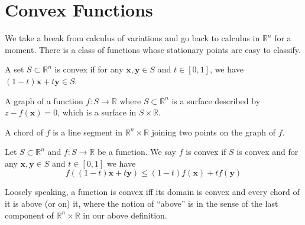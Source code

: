 \documentclass[a4paper]{article}
\begin{document}
\section{Convex Functions}
We take a break from calculus of variations and go back to calculus in $\mathbb R^n$ for a moment.
There is a class of functions whose stationary points are easy to classify.
\begin{definition}
    A set $S\subset\mathbb R^n$ is convex if for any $\mathbf{x},\mathbf{y}\in S$ and $t\in[0,1]$, we have $(1-t)\mathbf{x}+t\mathbf{y}\in S$.
\end{definition}
\begin{definition}
    A graph of a function $f:S\to\mathbb R$ where $S\subset\mathbb R^n$ is a surface described by $z-f(\mathbf{x})=0$, which is a surface in $S\times\mathbb R$.

    A chord of $f$ is a line segment in $\mathbb R^n\times\mathbb R$ joining two points on the graph of $f$.
\end{definition}
\begin{definition}
    Let $S\subset\mathbb R^n$ and $f:S\to\mathbb R$ be a function.
    We say $f$ is convex if $S$ is convex and for any $\mathbf{x},\mathbf{y}\in S$ and $t\in[0,1]$ we have
    $$f((1-t)\mathbf{x}+t\mathbf{y})\le (1-t)f(\mathbf{x})+tf(\mathbf{y})$$
\end{definition}
Loosely speaking, a function is convex iff its domain is convex and every chord of it is above (or on) it, where the notion of ``above'' is in the sense of the last component of $\mathbb R^n\times\mathbb R$ in our above definition.
\newpage
\end{document}
